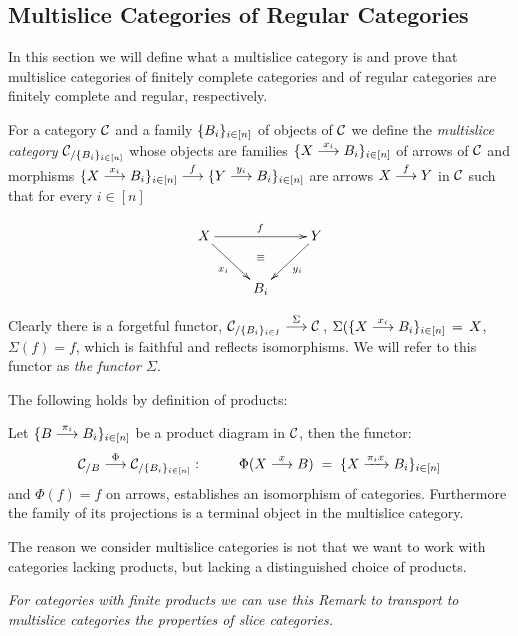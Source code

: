 \subsection{Multislice Categories of Regular Categories} \label{slices}
In this section we will define what a multislice category is and prove that  multislice categories of finitely complete categories and  of regular categories are finitely complete and regular, respectively.

\begin{definition}
For a category $\mathcal{C}$ and a family $\{B_i\}_{ i \in [n]}$ of objects of $\mathcal{C}$ we define the \emph{multislice category} $\mathcal{C}_{/\{B_i\}_{ i \in [n]}}$ whose objects are families 
${\{X \overset {x_i} {\longrightarrow} B_i\}_{ i \in [n]}}$ of arrows of $\mathcal{C}$ and morphisms ${\{X \overset {x_i} {\longrightarrow} B_i\}_{ i \in [n]} \overset {f} {\longrightarrow} \{Y \overset {y_i} {\longrightarrow} B_i\}_{ i \in [n]}}$ are arrows $X \overset {f} {\longrightarrow} Y$ in $\mathcal{C}$ such that for every ${ i \in [n]}$

\[
\xymatrix{X \ar[rr]^f \ar[dr]_{x_i} && Y \ar[dl]^{y_i}
\\
		    & B_i \ar@{}[u]|(.6)\equiv & }
\]
\end{definition}

\begin{remark} \label{Sigma}
Clearly there is a forgetful functor,   
$\mathcal{C}_{/{\{B_i\}_{i \in I}}} \overset {\Sigma} {\longrightarrow} \mathcal{C}$\,, 
\mbox{$\Sigma({\{X \overset {x_i} {\longrightarrow} B_i\}_{ i \in [n]}} \,=\, X$, $\Sigma(f) = f$,}
which is faithful and reflects isomorphisms. We will refer to this functor  as \emph{the functor $\Sigma$}. \cqd
\end{remark}

%
The following holds by definition of products:
 \begin{remark} \label{propSigma}
Let ${\{B \overset {\pi_i} {\longrightarrow} B_i\}_{ i \in [n]}}$ be a product diagram in $\mathcal{C}$, then the functor:
$$
\mathcal{C}_{/B}  \overset {\Phi} {\longrightarrow}  \mathcal{C}_{/\{B_i\}_{ i \in [n]}}: \hspace{6ex} 
\Phi(X \overset {x} {\longrightarrow} B)  \;=\;  {\{X \xrightarrow{\pi_i  x} B_i\}_{ i \in [n]}}
$$
and $\Phi(f) = f$ on arrows, establishes an isomorphism of categories. Furthermore the family of its projections is a terminal object in the multislice category.
\end{remark}
The reason we consider multislice categories is not that we want to work with categories lacking products, but lacking a distinguished choice of products.

\emph{For categories with finite products we can use this Remark to transport to multislice categories the properties of slice categories.}

